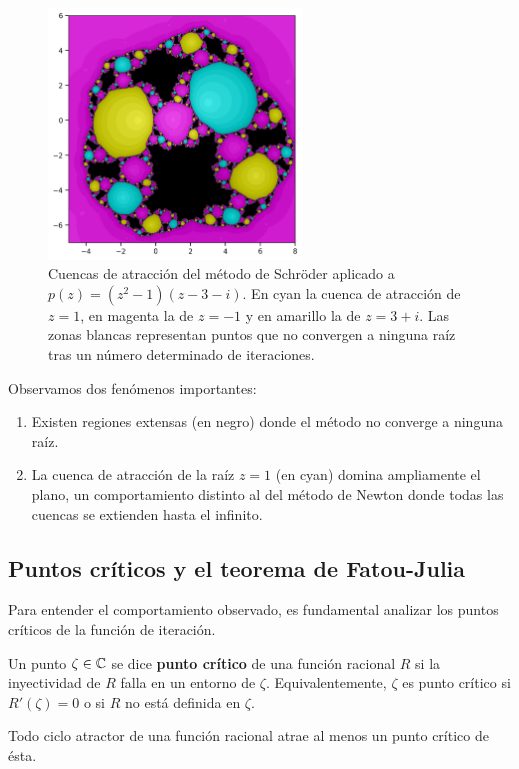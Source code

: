 \begin{figure}[H]
\centering 
\includegraphics[width=0.6\textwidth]{img/sch_3+i.png}
\caption{Cuencas de atracción del método de Schröder aplicado a $p(z)=(z^2-1)(z-3-i)$. En cyan la cuenca de atracción de $z=1$, en magenta la de $z=-1$ y en amarillo la de $z=3+i$. Las zonas blancas representan puntos que no convergen a ninguna raíz tras un número determinado de iteraciones.}
\label{fig:cuenca_cubica_1}
\end{figure}

Observamos dos fenómenos importantes:
\begin{enumerate}
\item Existen regiones extensas (en negro) donde el método no converge a ninguna raíz.
\item La cuenca de atracción de la raíz $z=1$ (en cyan) domina ampliamente el plano, un comportamiento distinto al del método de Newton donde todas las cuencas se extienden hasta el infinito.
\end{enumerate}

\subsection{Puntos críticos y el teorema de Fatou-Julia}

Para entender el comportamiento observado, es fundamental analizar los puntos críticos de la función de iteración.

Un punto $\zeta\in\mathbb{C}$ se dice \textbf{punto crítico} de una función racional $R$ si la inyectividad de $R$ falla en un entorno de $\zeta$. Equivalentemente, $\zeta$ es punto crítico si $R'(\zeta)=0$ o si $R$ no está definida en $\zeta$.

\begin{teorema}
\label{teo:fatou_julia}
Todo ciclo atractor de una función racional atrae al menos un punto crítico de ésta.
\end{teorema}


